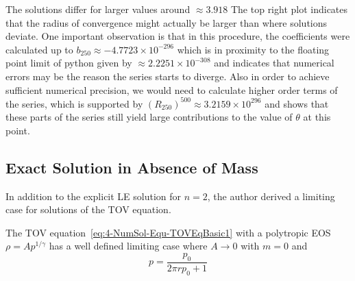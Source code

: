 The solutions differ for larger values around $\approx3.918$
The top right plot indicates that the radius of convergence might actually be larger than
where solutions deviate.
One important observation is that in this procedure, the coefficients were calculated up to $b_{250}\approx-4.7723\times10^{-296}$ which is in proximity to the floating point limit of python given by $\approx2.2251\times10^{-308}$ and indicates that numerical errors may be the reason the series starts to diverge.
Also in order to achieve sufficient numerical precision, we would need to calculate higher order terms of the series, which is supported by $(R_{250})^{500}\approx3.2159\times10^{296}$ and shows that these parts of the series still yield large contributions to the value of $\theta$ at this point.
%
%
%
\subsection{Exact \texorpdfstring{}{TOV} Solution in Absence of Mass}
\label{subsec:99-App-TOV-No-Mass}
In addition to the explicit \ac{LE} solution for $n=2$, the author derived a limiting case for solutions of the \ac{TOV} equation.
\begin{theorem}
	The TOV equation~\ref{eq:4-NumSol-Equ-TOVEqBasic1} with a polytropic EOS $\rho=Ap^{1/\gamma}$ has a well defined limiting case where $A\rightarrow0$ with $m=0$ and
	\begin{equation}
		p = \frac{p_0}{2\pi rp_0+1}
		\label{eq:99-App-TOV-No-Mass-Sol}
	\end{equation}
\end{theorem}
